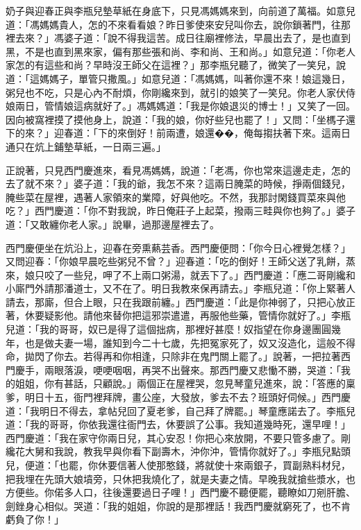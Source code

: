 奶子與迎春正與李瓶兒墊草紙在身底下，只見馮媽媽來到，向前道了萬福。如意兒道：「馮媽媽貴人，怎的不來看看娘？昨日爹使來安兒叫你去，說你鎖著門，往那裡去來？」馮婆子道：「說不得我這苦。成日往廟裡修法，早晨出去了，是也直到黑，不是也直到黑來家，偏有那些張和尚、李和尚、王和尚。」如意兒道：「你老人家怎的有這些和尚？早時沒王師父在這裡？」那李瓶兒聽了，微笑了一笑兒，說道：「這媽媽子，單管只撒風。」如意兒道：「馮媽媽，叫著你還不來！娘這幾日，粥兒也不吃，只是心內不耐煩，你剛纔來到，就引的娘笑了一笑兒。你老人家伏侍娘兩日，管情娘這病就好了。」馮媽媽道：「我是你娘退災的博士！」又笑了一回。因向被窩裡摸了摸他身上，說道：「我的娘，你好些兒也罷了！」又問：「坐榪子還下的來？」迎春道：「下的來倒好！前兩遭，娘還��，俺每搊扶著下來。這兩日通只在炕上鋪墊草紙，一日兩三遍。」

正說著，只見西門慶進來，看見馮媽媽，說道：「老馮，你也常來這邊走走，怎的去了就不來？」婆子道：「我的爺，我怎不來？這兩日腌菜的時候，掙兩個錢兒，腌些菜在屋裡，遇著人家領來的業障，好與他吃。不然，我那討閑錢買菜來與他吃？」西門慶道：「你不對我說，昨日俺莊子上起菜，撥兩三畦與你也夠了。」婆子道：「又敢纏你老人家。」說畢，過那邊屋裡去了。

西門慶便坐在炕沿上，迎春在旁熏爇芸香。西門慶便問：「你今日心裡覺怎樣？」又問迎春：「你娘早晨吃些粥兒不曾？」迎春道：「吃的倒好！王師父送了乳餅，蒸來，娘只咬了一些兒，呷了不上兩口粥湯，就丟下了。」西門慶道：「應二哥剛纔和小廝門外請那潘道士，又不在了。明日我教來保再請去。」李瓶兒道：「你上緊著人請去，那廝，但合上眼，只在我跟前纏。」西門慶道：「此是你神弱了，只把心放正著，休要疑影他。請他來替你把這邪崇遣遣，再服他些藥，管情你就好了。」李瓶兒道：「我的哥哥，奴已是得了這個拙病，那裡好甚麼！奴指望在你身邊團圓幾年，也是做夫妻一場，誰知到今二十七歲，先把冤家死了，奴又沒造化，這般不得命，拋閃了你去。若得再和你相逢，只除非在鬼門關上罷了。」說著，一把拉著西門慶手，兩眼落淚，哽哽咽咽，再哭不出聲來。那西門慶又悲慟不勝，哭道：「我的姐姐，你有甚話，只顧說。」兩個正在屋裡哭，忽見琴童兒進來，說：「答應的稟爹，明日十五，衙門裡拜牌，畫公座，大發放，爹去不去？班頭好伺候。」西門慶道：「我明日不得去，拿帖兒回了夏老爹，自己拜了牌罷。」琴童應諾去了。李瓶兒道：「我的哥哥，你依我還往衙門去，休要誤了公事。我知道幾時死，還早哩！」西門慶道：「我在家守你兩日兒，其心安忍！你把心來放開，不要只管多慮了。剛纔花大舅和我說，教我早與你看下副壽木，沖你沖，管情你就好了。」李瓶兒點頭兒，便道：「也罷，你休要信著人使那憨錢，將就使十來兩銀子，買副熟料材兒，把我埋在先頭大娘墳旁，只休把我燒化了，就是夫妻之情。早晚我就搶些漿水，也方便些。你偌多人口，往後還要過日子哩！」西門慶不聽便罷，聽瞭如刀剜肝膽、劍銼身心相似。哭道：「我的姐姐，你說的是那裡話！我西門慶就窮死了，也不肯虧負了你！」

